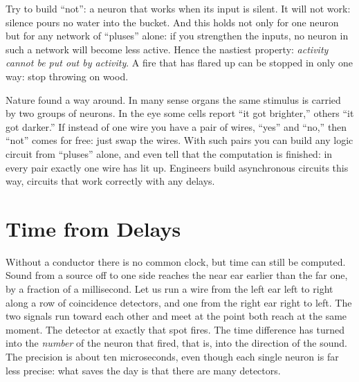 Try to build ``not'': a neuron that works when its input is silent. It will not work: silence pours no water into the bucket. And this holds not only for one neuron but for any network of ``pluses'' alone: if you strengthen the inputs, no neuron in such a network will become less active. Hence the nastiest property: \emph{activity cannot be put out by activity}. A fire that has flared up can be stopped in only one way: stop throwing on wood.

Nature found a way around. In many sense organs the same stimulus is carried by two groups of neurons. In the eye some cells report ``it got brighter,'' others ``it got darker.'' If instead of one wire you have a pair of wires, ``yes'' and ``no,'' then ``not'' comes for free: just swap the wires. With such pairs you can build any logic circuit from ``pluses'' alone, and even tell that the computation is finished: in every pair exactly one wire has lit up. Engineers build asynchronous circuits this way, circuits that work correctly with any delays.

\section*{Time from Delays}

Without a conductor there is no common clock, but time can still be computed. Sound from a source off to one side reaches the near ear earlier than the far one, by a fraction of a millisecond. Let us run a wire from the left ear left to right along a row of coincidence detectors, and one from the right ear right to left. The two signals run toward each other and meet at the point both reach at the same moment. The detector at exactly that spot fires. The time difference has turned into the \emph{number} of the neuron that fired, that is, into the direction of the sound. The precision is about ten microseconds, even though each single neuron is far less precise: what saves the day is that there are many detectors.

